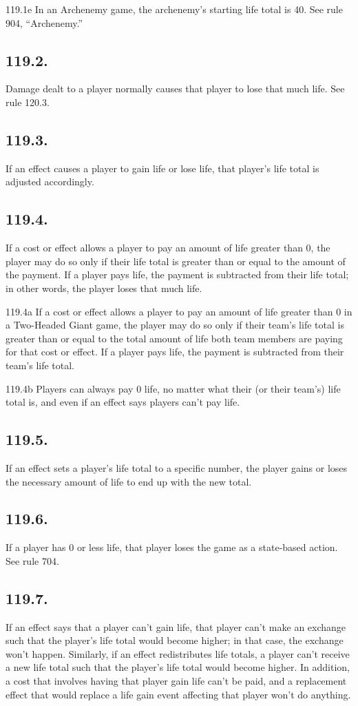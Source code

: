 119.1e In an Archenemy game, the archenemy’s starting life total is 40. See rule 904, “Archenemy.”

\subsection*{119.2.}
Damage dealt to a player normally causes that player to lose that much life. See rule 120.3.

\subsection*{119.3.}
If an effect causes a player to gain life or lose life, that player’s life total is adjusted accordingly.

\subsection*{119.4.}
If a cost or effect allows a player to pay an amount of life greater than 0, the player may do so only if their life total is greater than or equal to the amount of the payment. If a player pays life, the payment is subtracted from their life total; in other words, the player loses that much life.

119.4a If a cost or effect allows a player to pay an amount of life greater than 0 in a Two-Headed Giant game, the player may do so only if their team’s life total is greater than or equal to the total amount of life both team members are paying for that cost or effect. If a player pays life, the payment is subtracted from their team’s life total.

119.4b Players can always pay 0 life, no matter what their (or their team’s) life total is, and even if an effect says players can’t pay life.

\subsection*{119.5.}
If an effect sets a player’s life total to a specific number, the player gains or loses the necessary amount of life to end up with the new total.

\subsection*{119.6.}
If a player has 0 or less life, that player loses the game as a state-based action. See rule 704.

\subsection*{119.7.}
If an effect says that a player can’t gain life, that player can’t make an exchange such that the player’s life total would become higher; in that case, the exchange won’t happen. Similarly, if an effect redistributes life totals, a player can’t receive a new life total such that the player’s life total would become higher. In addition, a cost that involves having that player gain life can’t be paid, and a replacement effect that would replace a life gain event affecting that player won’t do anything.

